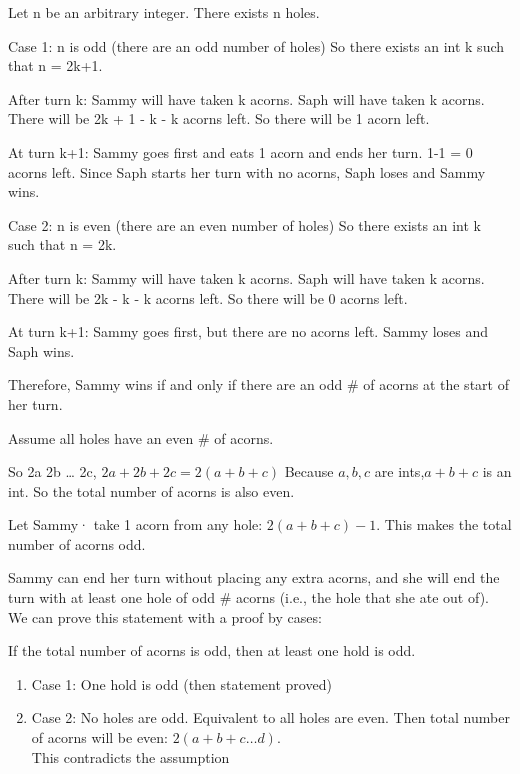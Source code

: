 \documentclass[12pt]{exam}
\begin{document}
\begin{solution}
\begin{qparts}
    \item 
    Let n be an arbitrary integer. There exists n holes.

Case 1: n is odd (there are an odd number of holes)
So there exists an int k such that n = 2k+1.

After turn k:
Sammy will have taken k acorns.
Saph will have taken k acorns.
There will be 2k + 1 - k - k acorns left.
So there will be 1 acorn left.

At turn k+1:
Sammy goes first and eats 1 acorn and ends her turn.
1-1 = 0 acorns left.
Since Saph starts her turn with no acorns, Saph loses and Sammy wins.

Case 2: n is even (there are an even number of holes)
So there exists an int k such that n = 2k.

After turn k:
Sammy will have taken k acorns.
Saph will have taken k acorns.
There will be 2k - k - k acorns left.
So there will be 0 acorns left.

At turn k+1:
Sammy goes first, but there are no acorns left. Sammy loses and Saph wins.

Therefore, Sammy wins if and only if there are an odd \# of acorns at the start of her turn.

\item 
Assume all holes have an even \# of acorns.

So 2a 2b … 2c, $2a + 2b + 2c = 2(a+b+c)$
Because $a,b, c$ are ints,$ a+b+c$ is an int. So the total number of acorns is also even.

Let Sammy· take 1 acorn from any hole:
$2(a+b+c) - 1$.
This makes the total number of acorns odd.

Sammy can end her turn without placing any extra acorns, and she will end the turn with at least one hole of odd \# acorns (i.e., the hole that she ate out of). We can prove this statement with a proof by cases: 

If the total number of acorns is odd, then at least one hold is odd.
\begin{enumerate}
    \item Case 1: One hold is odd (then statement proved)
    \item Case 2: No holes are odd. Equivalent to all holes are even. Then total number of acorns will be even: $2(a+b+c…d)$.\\
    This contradicts the assumption
\end{enumerate}


\end{qparts}
\end{solution}
\end{document}
